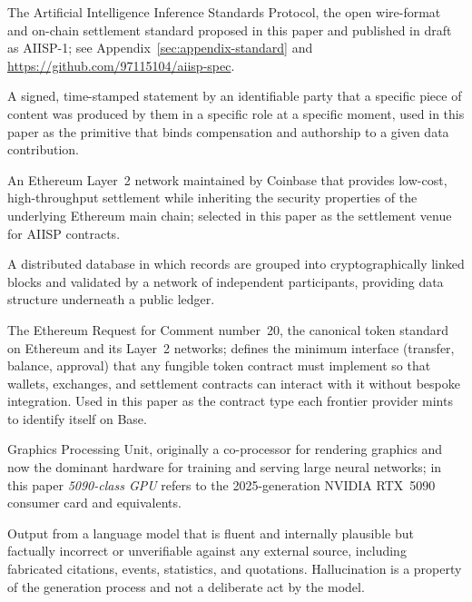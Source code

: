 \documentclass[10pt,a4paper,twocolumn]{article}
\begin{document}
\begin{description}\setlength{\itemsep}{2pt plus 0.5pt}

\item[AIISP.] The Artificial Intelligence Inference Standards Protocol, the open wire-format and on-chain settlement standard proposed in this paper and published in draft as AIISP-1; see Appendix~\ref{sec:appendix-standard} and \url{https://github.com/97115104/aiisp-spec}.

\item[Attestation.] A signed, time-stamped statement by an identifiable party that a specific piece of content was produced by them in a specific role at a specific moment, used in this paper as the primitive that binds compensation and authorship to a given data contribution.

\item[Base.] An Ethereum Layer~2 network maintained by Coinbase that provides low-cost, high-throughput settlement while inheriting the security properties of the underlying Ethereum main chain; selected in this paper as the settlement venue for AIISP contracts.

\item[Blockchain.] A distributed database in which records are grouped into cryptographically linked blocks and validated by a network of independent participants, providing data structure underneath a public ledger.

\item[ERC-20.] The Ethereum Request for Comment number~20, the canonical token standard on Ethereum and its Layer~2 networks; defines the minimum interface (transfer, balance, approval) that any fungible token contract must implement so that wallets, exchanges, and settlement contracts can interact with it without bespoke integration. Used in this paper as the contract type each frontier provider mints to identify itself on Base.

\item[GPU.] Graphics Processing Unit, originally a co-processor for rendering graphics and now the dominant hardware for training and serving large neural networks; in this paper \emph{5090-class GPU} refers to the 2025-generation NVIDIA RTX~5090 consumer card and equivalents.

\item[Hallucination.] Output from a language model that is fluent and internally plausible but factually incorrect or unverifiable against any external source, including fabricated citations, events, statistics, and quotations. Hallucination is a property of the generation process and not a deliberate act by the model.


\end{description}
\end{document}

